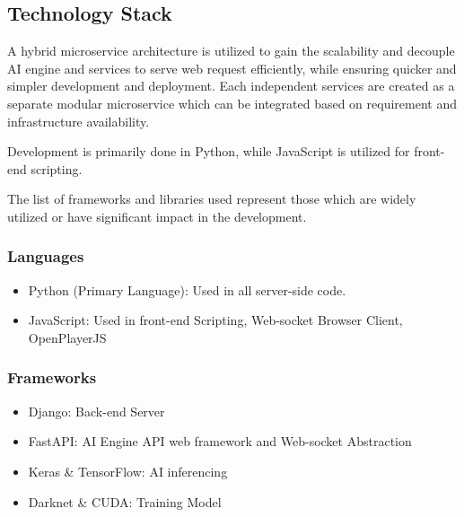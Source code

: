 \subsection*{Technology Stack}
A hybrid microservice architecture is utilized to gain the scalability and decouple AI engine and services to serve web request efficiently, while ensuring quicker and simpler development and deployment. Each independent services are created as a separate modular microservice which can be integrated based on requirement and infrastructure availability.

Development is primarily done in Python, while JavaScript is utilized for front-end scripting.

The list of frameworks and libraries used represent those which are widely utilized or have significant impact in the development.

\subsubsection*{Languages}
\begin{itemize}
	\item Python (Primary Language): Used in all server-side code.
	\item JavaScript: Used in front-end Scripting, Web-socket Browser Client, OpenPlayerJS
\end{itemize}

\subsubsection*{Frameworks}
\begin{itemize}
	\item Django: Back-end Server
	\item FastAPI: AI Engine API web framework and Web-socket Abstraction
	\item Keras \& TensorFlow: AI inferencing
	\item Darknet \& CUDA: Training Model
\end{itemize}

